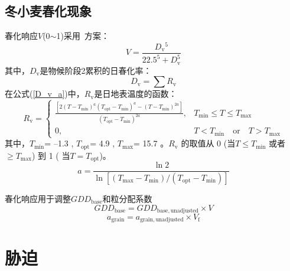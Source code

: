 \subsection{冬小麦春化现象}
春化响应$V$(0$\sim$1)采用~\citet{streck2003incorporating}方案：
\begin{equation}
V=\frac{D_{\mathrm{v}}{ }^{5}}{22.5^{5}+D_{\mathrm{v}}^{5}}
\end{equation}
其中，$D_{\mathrm {v}} $是物候阶段2累积的日春化率：
\begin{equation}\label{D_v_a}
D_{\mathrm{v}}=\sum R_{\mathrm{v}}
\end{equation}
在公式(\ref{D_v_a})中，$R_{\mathrm{v}}$是日地表温度的函数：
\begin{equation}
R_{\mathrm{v}} = \begin{cases}
\frac{\left[2\left(T-T_{\mathrm{min}}\right)^{a}\left(T_{\mathrm{opt}}-T_{\mathrm{min}}\right)^{a} - \left(T-T_{\mathrm{min}}\right)^{2a}\right]}{\left(T_{\mathrm{opt}}-T_{\mathrm{min}}\right)^{2a}}, &T_{\mathrm{min}} \leqslant T \leqslant T_{\mathrm{max}} \\
0,  &T<T_{\mathrm{min}} \quad  \text{or} \quad T>T_{\mathrm{max}}
\end{cases}
\end{equation}
其中，$T_{\mathrm{min}}$= –1.3 \textcelsius, $T_{\mathrm{opt}}$= 4.9 \textcelsius, $T_{\mathrm{max}}$= 15.7 \textcelsius。$ R_{\mathrm {v}} $ 的取值从 0 (当$ T\leqslant T_{\mathrm{min}}$ 或者 $ \geqslant  T_{\mathrm{max}}$) 到 1 ( 当$T=T_{\mathrm{opt}}$)。
\begin{equation}
a=\frac{\ln 2}{\ln \left[\left(T_{\max }-T_{\min }\right) /\left(T_{\mathrm{o p t}}-T_{\min }\right)\right]}
\end{equation}

春化响应用于调整$GDD_{\mathrm{base}}$和粒分配系数
\begin{equation}
G D D_{\mathrm{b a s e}}=G D D_{\mathrm{b a s e,  { unadjusted }}} \times V
\end{equation}
\begin{equation}
a_{\mathrm{ {grain }}}=a_{\mathrm{ {grain,unadjusted }}} \times V_{\mathrm{f}}
\end{equation}


\section{胁迫}
